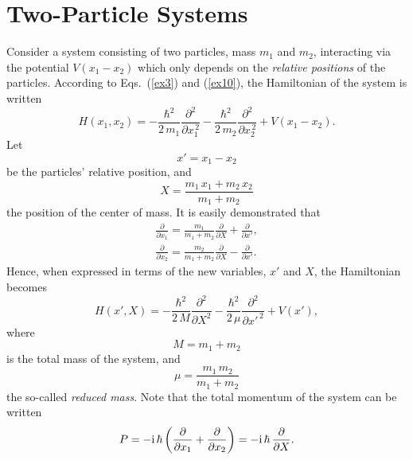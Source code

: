  \section{Two-Particle Systems}\label{stwo}
 Consider a system consisting of two particles, mass $m_1$ and $m_2$, 
 interacting via the potential $V(x_1-x_2)$ which only depends on the
 {\em relative positions}\/ of the particles.  According to Eqs.~(\ref{ex3})
 and (\ref{ex10}), the Hamiltonian of the system is written
 \begin{equation}
 H(x_1,x_2) = -\frac{\hbar^2}{2\,m_1}\frac{\partial^2}{\partial x_1^{\,2}}
 - \frac{\hbar^2}{2\,m_2}\frac{\partial^2}{\partial x_2^{\,2}}+ V(x_1-x_2).
 \end{equation}
 Let
 \begin{equation}
 x' = x_1-x_2
 \end{equation}
 be the particles' relative position, and
 \begin{equation}
 X = \frac{m_1\,x_1+m_2\,x_2}{m_1+m_2}
 \end{equation}
 the position of the center of mass. 
 It is easily demonstrated that
 \begin{eqnarray}
 \frac{\partial}{\partial x_1} = \frac{m_1}{m_1+m_2}\frac{\partial}{\partial X} + \frac{\partial}{\partial x'},\\[0.5ex]
  \frac{\partial}{\partial x_2} = \frac{m_2}{m_1+m_2}\frac{\partial}{\partial X} - \frac{\partial}{\partial x'}.
 \end{eqnarray}
 Hence, when expressed in terms of the new variables, $x'$ and $X$, 
 the Hamiltonian becomes
 \begin{equation}\label{ex6.24}
 H(x',X) = -\frac{\hbar^2}{2\,M} \frac{\partial^2}{\partial X^2}
 -\frac{\hbar^2}{2\,\mu}\frac{\partial^2}{\partial x'^{\,2}} + V(x'),
 \end{equation}
 where
 \begin{equation}
 M = m_1+ m_2
 \end{equation}
 is the total mass of the system, and
 \begin{equation}
 \mu = \frac{m_1\,m_2}{m_1+m_2}
 \end{equation}
 the so-called {\em reduced mass}.
 Note that the total momentum of the system can be written
 \begin{equation}\label{exa}
P= -{\rm i}\,\hbar\left(\frac{\partial}{\partial x_1} + \frac{\partial}{\partial x_2}\right) = -{\rm i}\,\hbar\,\frac{\partial}{\partial X}.
 \end{equation}
 
